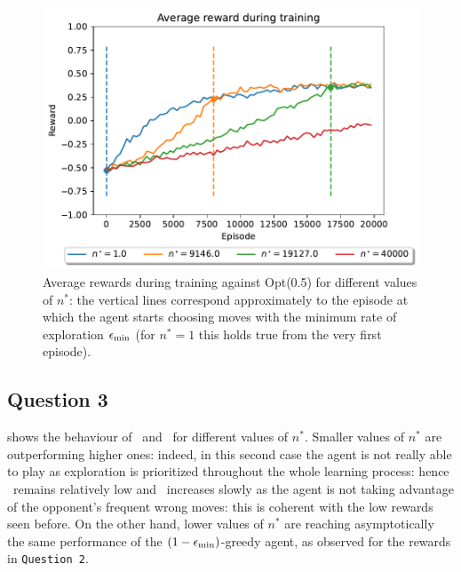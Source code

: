 \documentclass[10pt]{IEEEtran}
\begin{document}

\begin{figure}[H]
    \centering
    \includegraphics[width = 0.85\linewidth]{code/figures/rewards_n_star.pdf}
    \caption{Average rewards during training against Opt(0.5) for different values of $n^{*}$: the vertical lines correspond approximately to the episode at which the agent starts choosing moves with the minimum rate of exploration $\epsilon_{\text{min}}$ (for $n^{*} = 1$ this holds true from the very first episode).}
    \label{plot_question2}
\end{figure}

\subsection*{Question 3}
 shows the behaviour of \mopt\ and \mrand\ for different values of $n^*$. Smaller values of $n^{*}$ are outperforming higher ones: indeed, in this second case the agent is not really able to play as exploration is prioritized throughout the whole learning process: hence \mopt\ remains relatively low and \mrand\ increases slowly as the agent is not taking advantage of the opponent's frequent wrong moves: this is coherent with the low rewards seen before. On the other hand, lower values of $n^*$ are reaching asymptotically the same performance of the $(1-\epsilon_{\text{min}})$-greedy agent, as observed for the rewards in \texttt{Question 2}.
\end{document}
